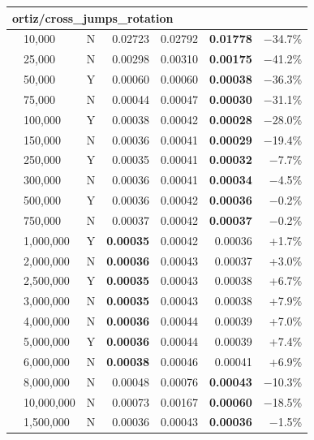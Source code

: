\documentclass[9pt]{article}
\begin{document}
\begin{longtable}{llr|rrr|r}
\midrule
\multicolumn{7}{l}{\textbf{ortiz/cross\_jumps\_rotation}} \\
\midrule
 & 10,000 & N & 0.02723 & 0.02792 & \textbf{0.01778} & $-$34.7\% \\
 & 25,000 & N & 0.00298 & 0.00310 & \textbf{0.00175} & $-$41.2\% \\
 & 50,000 & Y & 0.00060 & 0.00060 & \textbf{0.00038} & $-$36.3\% \\
 & 75,000 & N & 0.00044 & 0.00047 & \textbf{0.00030} & $-$31.1\% \\
 & 100,000 & Y & 0.00038 & 0.00042 & \textbf{0.00028} & $-$28.0\% \\
 & 150,000 & N & 0.00036 & 0.00041 & \textbf{0.00029} & $-$19.4\% \\
 & 250,000 & Y & 0.00035 & 0.00041 & \textbf{0.00032} & $-$7.7\% \\
 & 300,000 & N & 0.00036 & 0.00041 & \textbf{0.00034} & $-$4.5\% \\
 & 500,000 & Y & 0.00036 & 0.00042 & \textbf{0.00036} & $-$0.2\% \\
 & 750,000 & N & 0.00037 & 0.00042 & \textbf{0.00037} & $-$0.2\% \\
\rowcolor{win} & 1,000,000 & Y & \textbf{0.00035} & 0.00042 & 0.00036 & +1.7\% \\
\rowcolor{win} & 2,000,000 & N & \textbf{0.00036} & 0.00043 & 0.00037 & +3.0\% \\
\rowcolor{win} & 2,500,000 & Y & \textbf{0.00035} & 0.00043 & 0.00038 & +6.7\% \\
\rowcolor{win} & 3,000,000 & N & \textbf{0.00035} & 0.00043 & 0.00038 & +7.9\% \\
\rowcolor{win} & 4,000,000 & N & \textbf{0.00036} & 0.00044 & 0.00039 & +7.0\% \\
\rowcolor{win} & 5,000,000 & Y & \textbf{0.00036} & 0.00044 & 0.00039 & +7.4\% \\
\rowcolor{win} & 6,000,000 & N & \textbf{0.00038} & 0.00046 & 0.00041 & +6.9\% \\
 & 8,000,000 & N & 0.00048 & 0.00076 & \textbf{0.00043} & $-$10.3\% \\
 & 10,000,000 & N & 0.00073 & 0.00167 & \textbf{0.00060} & $-$18.5\% \\
 & 1,500,000 & N & 0.00036 & 0.00043 & \textbf{0.00036} & $-$1.5\% \\


\end{longtable}
\end{document}
